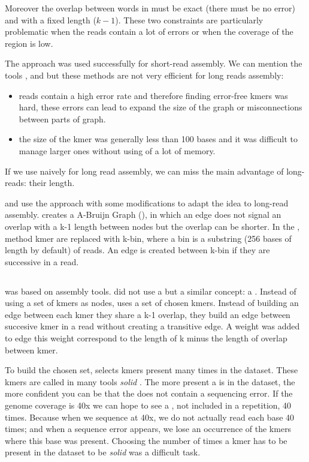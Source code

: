 \documentclass[main]{subfiles}
\begin{document}
Moreover the overlap between words in \DBG must be exact (there must be no error) and with a fixed length ($k - 1$). These two constraints are particularly problematic when the reads contain a lot of errors or when the coverage of the region is low.

The \DBG approach was used successfully for short-read assembly. We can mention the tools  \cite{spades},  \cite{minia} and \cite{megahit} but these methods are not very efficient for long reads assembly:
\begin{itemize}
    \item reads contain a high error rate and therefore finding error-free kmers was hard, these errors can lead to expand the size of the graph or misconnections between parts of graph.
    \item the size of the kmer was generally less than 100 bases and it was difficult to manage larger ones without using of a lot of memory.
\end{itemize}

If we use \DBG naively for long read assembly, we can miss the main advantage of long-reads: their length.

\flye and \wtdbg use the \DBG approach with some modifications to adapt the idea to long-read assembly. \flye creates a A-Bruijn Graph (), in which an edge does not signal an overlap with a k-1 length between nodes but the overlap can be shorter. In the \wtdbg, method kmer are replaced with k-bin, where a bin is a substring (256 bases of length by default) of reads. An edge is created between k-bin if they are successive in a read.

\subsection{\flye}

\flye\cite{Flye} was based on \abruijn\cite{abruijn} assembly tools. \abruijn did not use a \DBG but a similar concept: a . Instead of using a set of kmers as nodes,  uses a set of chosen kmers. Instead of building an edge between each kmer they share a k-1 overlap, they build an edge between succesive kmer in a read without creating a transitive edge. A weight was added to edge this weight correspond to the length of k minus the length of overlap between kmer.

To build the chosen \kmers set, \abruijn selects kmers present many times in the dataset. These kmers are called in many tools \textit{solid} \kmers {} . The more present a \kmer is in the dataset, the more confident you can be that the \kmer does not contain a sequencing error. If the genome coverage is 40x we can hope to see a \kmer, not included in a repetition, 40 times. Because when we sequence at 40x, we do not actually read each base 40 times; and when a sequence error appears, we lose an occurrence of the kmers where this base was present. Choosing the number of times a kmer has to be present in the dataset to be \textit{solid} was a difficult task.
\end{document}
